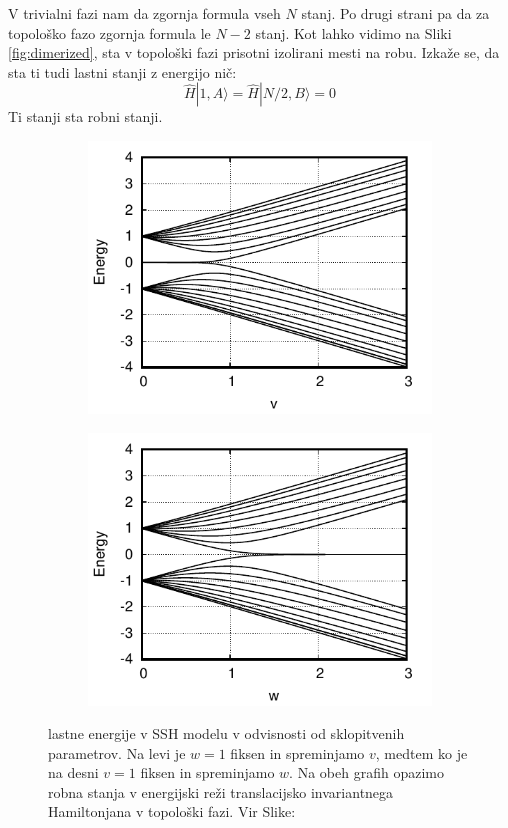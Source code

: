 V trivialni fazi nam da zgornja formula vseh $N$ stanj.  Po drugi strani pa da za topološko fazo zgornja formula le $N-2$ stanj. Kot lahko vidimo na Sliki \ref{fig:dimerized}, sta v topološki fazi prisotni izolirani mesti na robu. Izkaže se, da sta ti tudi lastni stanji z energijo nič:
\begin{equation}
\hat{H} |1, A \rangle = \hat{H} | N/2, B \rangle = 0
\end{equation}
Ti stanji sta robni stanji.
\begin{figure}[H]
\centering
\begin{subfigure}{.48\textwidth}
\includegraphics[width=\linewidth]{Figures/energy.pdf}
\end{subfigure}
\begin{subfigure}{.48\textwidth}
\includegraphics[width=\linewidth]{Figures/energy2.pdf}
\end{subfigure}
\caption{lastne energije v SSH modelu v odvisnosti od sklopitvenih parametrov. Na levi je $w=1$ fiksen in spreminjamo $v$, medtem ko je na desni $v=1$ fiksen in spreminjamo $w$. Na obeh grafih opazimo robna stanja v energijski reži translacijsko invariantnega Hamiltonjana v topološki fazi. Vir Slike: \cite{arxiv}}
\label{fig:movingaway}
\end{figure}
